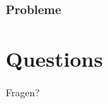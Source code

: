 \documentclass[
	10pt,
	t		%
]{beamer}
\begin{document}
\begin{frame}
\frametitle{Probleme}

\end{frame}

\section{Questions}
\begin{frame}[plain, c]
\begin{center}
\Large Fragen?
\end{center}
\end{frame}
\end{document}
